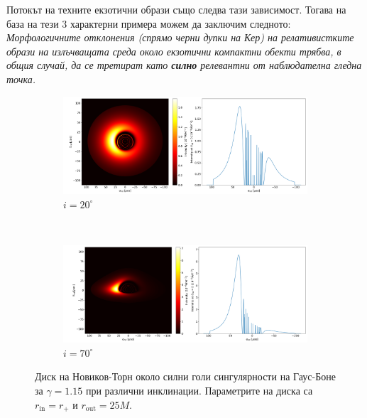 Потокът на техните екзотични образи също следва тази зависимост. Тогава на база на тези 3 характерни примера можем да заключим следното:\\

\emph{Морфологичните отклонения (спрямо черни дупки на Кер) на релативистките образи на излъчващата среда около екзотични компактни обекти трябва, в общия случай, да се третират като \textbf{силно} релевантни от наблюдателна гледна точка.}\\
\begin{figure}[!htb]
	\centering
	\begin{subfigure}{12cm}
		\hspace{-0.6cm}
		\includegraphics[scale = 0.26]{GB_NT_Gamma1.15_20_deg.png}
		\caption{$i = 20^\circ$} 
	\end{subfigure}\\
	\begin{subfigure}{12cm}
		\hspace{-0.6cm}
		\includegraphics[scale = 0.26]{GB_NT_Gamma1.15_70_deg.png}
		\caption{$i = 70^\circ$} 
	\end{subfigure}
	\caption[Диск на Новиков-Торн около силни голи сингулярности на Гаус Боне при различни инклинации.]{\small Диск на Новиков-Торн около силни голи сингулярности на Гаус-Боне за $\gamma = 1.15$ при различни инклинации. Параметрите на диска са $r_\text{in} = r_\text{+}$ и $r_\text{out} = 25M$.} 
	\label{GB_NT}
\end{figure}

